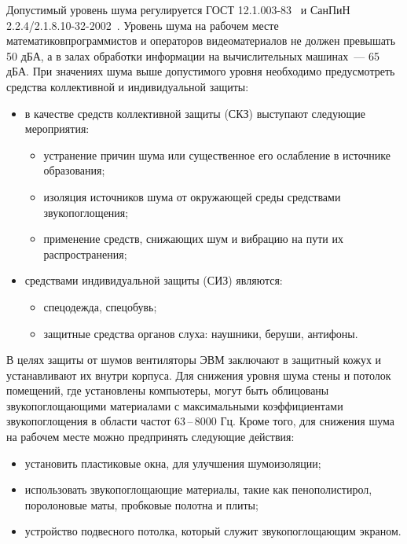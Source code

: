 Допустимый уровень шума регулируется ГОСТ 12.1.003-83~\cite{Gost2002} и СанПиН 2.2.4/2.1.8.10-32-2002~\cite{SanPin2002}. 
Уровень шума на рабочем месте математиков\-программистов и операторов видеоматериалов не должен превышать 50 дБА, а в залах обработки информации на вычислительных машинах~--- 65 дБА.
При значениях шума выше допустимого уровня необходимо предусмотреть средства коллективной и индивидуальной защиты:
\begin{itemize}
    \item в качестве средств коллективной защиты (СКЗ) выступают следующие мероприятия:
    \begin{itemize}[leftmargin=+]
        \item устранение причин шума или существенное его ослабление в источнике образования;
        \item изоляция источников шума от окружающей среды средствами звукопоглощения;
        \item применение средств, снижающих шум и вибрацию на пути их распространения;
    \end{itemize}
    \item средствами индивидуальной защиты (СИЗ) являются:
    \begin{itemize}[leftmargin=+]
        \item спецодежда, спецобувь;
        \item защитные средства органов слуха: наушники, беруши, антифоны.
    \end{itemize}
\end{itemize}

В целях защиты от шумов вентиляторы ЭВМ заключают в защитный кожух и устанавливают их внутри корпуса. 
Для снижения уровня шума стены и потолок помещений, где установлены компьютеры, могут быть облицованы звукопоглощающими материалами с максимальными коэффициентами звукопоглощения в области частот 63\,--\,8000 Гц.
Кроме того, для снижения шума на рабочем месте можно предпринять следующие действия:
\begin{itemize}
    \item установить пластиковые окна, для улучшения шумоизоляции;
    \item использовать звукопоглощающие материалы, такие как пенополистирол, поролоновые маты, пробковые полотна и плиты;
    \item устройство подвесного потолка, который служит звукопоглощающим экраном.
\end{itemize}


